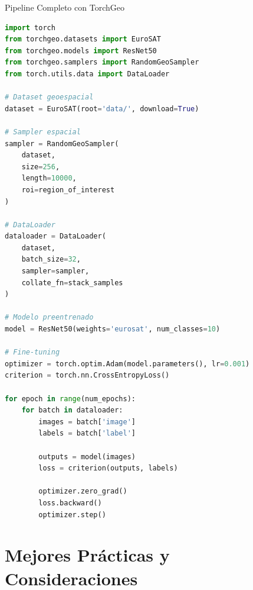 \documentclass[10pt,aspectratio=169]{beamer}
\begin{document}
\begin{frame}[fragile]{Pipeline Completo con TorchGeo}
\begin{lstlisting}[language=Python,basicstyle=\tiny]
import torch
from torchgeo.datasets import EuroSAT
from torchgeo.models import ResNet50
from torchgeo.samplers import RandomGeoSampler
from torch.utils.data import DataLoader

# Dataset geoespacial
dataset = EuroSAT(root='data/', download=True)

# Sampler espacial
sampler = RandomGeoSampler(
    dataset,
    size=256,
    length=10000,
    roi=region_of_interest
)

# DataLoader
dataloader = DataLoader(
    dataset,
    batch_size=32,
    sampler=sampler,
    collate_fn=stack_samples
)

# Modelo preentrenado
model = ResNet50(weights='eurosat', num_classes=10)

# Fine-tuning
optimizer = torch.optim.Adam(model.parameters(), lr=0.001)
criterion = torch.nn.CrossEntropyLoss()

for epoch in range(num_epochs):
    for batch in dataloader:
        images = batch['image']
        labels = batch['label']

        outputs = model(images)
        loss = criterion(outputs, labels)

        optimizer.zero_grad()
        loss.backward()
        optimizer.step()
\end{lstlisting}
\end{frame}

\section{Mejores Prácticas y Consideraciones}
\end{document}
